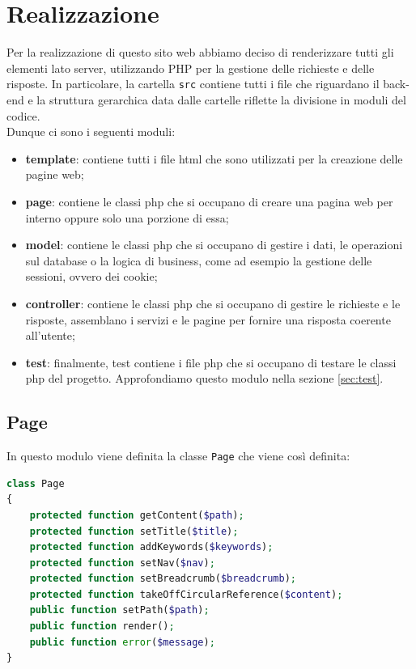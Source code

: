 \section{Realizzazione}

Per la realizzazione di questo sito web abbiamo deciso di renderizzare tutti gli
elementi lato server, utilizzando PHP per la gestione delle richieste e delle
risposte. In particolare, la cartella \texttt{src} contiene tutti i file che
riguardano il back-end e la struttura gerarchica data dalle cartelle riflette la
divisione in moduli del codice.\\
Dunque ci sono i seguenti moduli:
\begin{itemize}
	\item \textbf{template}: contiene tutti i file html che sono utilizzati per
	      la creazione delle pagine web;

	\item \textbf{page}: contiene le classi php che si occupano di creare una
	      pagina web per interno oppure solo una porzione di essa;

	\item \textbf{model}: contiene le classi php che si occupano di gestire i
	      dati, le operazioni sul database o la logica di business, come ad
	      esempio la gestione delle sessioni, ovvero dei cookie;

	\item \textbf{controller}: contiene le classi php che si occupano di
	      gestire le richieste e le risposte, assemblano i servizi e le pagine
	      per fornire una risposta coerente all'utente;

	\item \textbf{test}: finalmente, test contiene i file php che si occupano di
	      testare le classi php del progetto. Approfondiamo questo modulo nella
	      sezione \ref{sec:test}.
\end{itemize}

\subsection{Page}

In questo modulo viene definita la classe \texttt{Page} che viene così definita:

\begin{lstlisting}[language=PHP]
class Page
{
    protected function getContent($path);
    protected function setTitle($title);
    protected function addKeywords($keywords);
    protected function setNav($nav);
    protected function setBreadcrumb($breadcrumb);
    protected function takeOffCircularReference($content);
    public function setPath($path);
    public function render();
    public function error($message);
}
\end{lstlisting}

